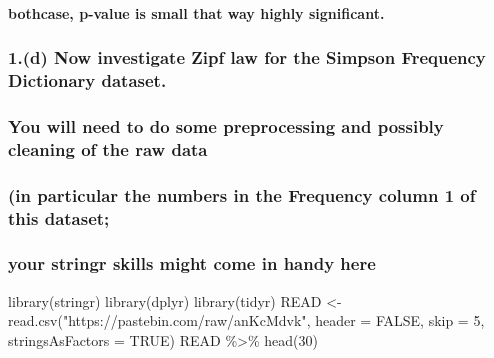 \documentclass[
]{article}
\newenvironment{Shaded}{\begin{snugshade}}{\end{snugshade}}
\newcommand{\AttributeTok}[1]{\textcolor[rgb]{0.77,0.63,0.00}{#1}}
\newcommand{\ConstantTok}[1]{\textcolor[rgb]{0.00,0.00,0.00}{#1}}
\newcommand{\DecValTok}[1]{\textcolor[rgb]{0.00,0.00,0.81}{#1}}
\newcommand{\FunctionTok}[1]{\textcolor[rgb]{0.00,0.00,0.00}{#1}}
\newcommand{\NormalTok}[1]{#1}
\newcommand{\OtherTok}[1]{\textcolor[rgb]{0.56,0.35,0.01}{#1}}
\newcommand{\SpecialCharTok}[1]{\textcolor[rgb]{0.00,0.00,0.00}{#1}}
\newcommand{\StringTok}[1]{\textcolor[rgb]{0.31,0.60,0.02}{#1}}
\begin{document}
\hypertarget{bothcase-p-value-is-small-that-way-highly-significant.}{%
\paragraph{bothcase, p-value is small that way highly
significant.}\label{bothcase-p-value-is-small-that-way-highly-significant.}}

\hypertarget{d-now-investigate-zipf-law-for-the-simpson-frequency-dictionary-dataset.}{%
\subsubsection{1.(d) Now investigate Zipf law for the Simpson Frequency
Dictionary
dataset.}\label{d-now-investigate-zipf-law-for-the-simpson-frequency-dictionary-dataset.}}

\hypertarget{you-will-need-to-do-some-preprocessing-and-possibly-cleaning-of-the-raw-data}{%
\subsubsection{You will need to do some preprocessing and possibly
cleaning of the raw
data}\label{you-will-need-to-do-some-preprocessing-and-possibly-cleaning-of-the-raw-data}}

\hypertarget{in-particular-the-numbers-in-the-frequency-column-1-of-this-dataset}{%
\subsubsection{(in particular the numbers in the Frequency column 1 of
this
dataset;}\label{in-particular-the-numbers-in-the-frequency-column-1-of-this-dataset}}

\hypertarget{your-stringr-skills-might-come-in-handy-here}{%
\subsubsection{your stringr skills might come in handy
here}\label{your-stringr-skills-might-come-in-handy-here}}

\begin{Shaded}
\begin{Highlighting}[]
\FunctionTok{library}\NormalTok{(stringr)}
\FunctionTok{library}\NormalTok{(dplyr)}
\FunctionTok{library}\NormalTok{(tidyr)}
\NormalTok{READ }\OtherTok{\textless{}{-}} \FunctionTok{read.csv}\NormalTok{(}\StringTok{"https://pastebin.com/raw/anKcMdvk"}\NormalTok{, }\AttributeTok{header =} \ConstantTok{FALSE}\NormalTok{, }
                \AttributeTok{skip =} \DecValTok{5}\NormalTok{, }\AttributeTok{stringsAsFactors =} \ConstantTok{TRUE}\NormalTok{)}
\NormalTok{READ }\SpecialCharTok{\%\textgreater{}\%} \FunctionTok{head}\NormalTok{(}\DecValTok{30}\NormalTok{)}
\end{Highlighting}
\end{Shaded}
\end{document}
